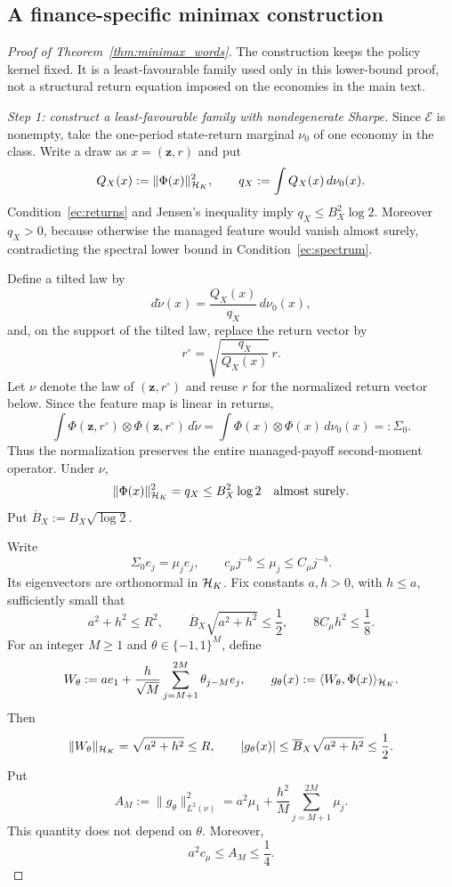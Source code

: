 \subsection{A finance-specific minimax construction}
\label{app:minimax}

\begin{proof}[Proof of Theorem~\ref{thm:minimax_words}]
The construction keeps the policy kernel fixed. It is a least-favourable family
used only in this lower-bound proof, not a structural return equation imposed on
the economies in the main text.

\medskip
\noindent\textit{Step 1: construct a least-favourable family with nondegenerate Sharpe.}
Since $\mathcal E$ is nonempty, take the one-period state-return marginal
$\nu_0$ of one economy in the class. Write a draw as
$x=(\mathbf z,r)$ and put
\[
Q_X(x):=\|\Phi(x)\|_{\mathcal{H}_K}^2,
\qquad
q_X:=\int Q_X(x)\,d\nu_0(x).
\]
Condition~\ref{ec:returns} and Jensen's inequality imply
$q_X\leq B_X^2\log2$. Moreover $q_X>0$, because otherwise the managed
feature would vanish almost surely, contradicting the spectral lower bound
in Condition~\ref{ec:spectrum}.

Define a tilted law by
\[
d\widetilde\nu(x)
=
\frac{Q_X(x)}{q_X}\,d\nu_0(x),
\]
and, on the support of the tilted law, replace the return vector by
\[
r^\circ
=
\sqrt{\frac{q_X}{Q_X(x)}}\,r.
\]
Let $\nu$ denote the law of $(\mathbf z,r^\circ)$ and reuse $r$ for the
normalized return vector below. Since the feature map is linear in returns,
\[
\int \Phi(\mathbf z,r^\circ)\otimes\Phi(\mathbf z,r^\circ)\,d\widetilde\nu
=
\int \Phi(x)\otimes\Phi(x)\,d\nu_0(x)
=:\Sigma_0.
\]
Thus the normalization preserves the entire managed-payoff second-moment
operator. Under $\nu$,
\[
\|\Phi(x)\|_{\mathcal{H}_K}^2=q_X\leq B_X^2\log2
\quad\text{almost surely}.
\]
Put $\overline B_X:=B_X\sqrt{\log2}$.

Write
\[
\Sigma_0e_j=\mu_je_j,
\qquad
c_\mu j^{-b}\leq\mu_j\leq C_\mu j^{-b}.
\]
Its eigenvectors are orthonormal in $\mathcal{H}_K$. Fix constants $a,h>0$,
with $h\leq a$, sufficiently small that
\[
a^2+h^2\leq R^2,
\qquad
\overline B_X\sqrt{a^2+h^2}\leq\frac12,
\qquad
8C_\mu h^2\leq\frac18.
\]
For an integer $M\geq1$ and $\theta\in\{-1,1\}^M$, define
\[
W_\theta
:=
a e_1
+
\frac{h}{\sqrt M}
\sum_{j=M+1}^{2M}\theta_{j-M}e_j,
\qquad
g_\theta(x)
:=
\langle W_\theta,\Phi(x)\rangle_{\mathcal{H}_K}.
\]
Then
\[
\|W_\theta\|_{\mathcal{H}_K}=\sqrt{a^2+h^2}\leq R,
\qquad
|g_\theta(x)|\leq \overline B_X\sqrt{a^2+h^2}\leq\frac12.
\]
Put
\[
A_M
:=
\|g_\theta\|_{L^2(\nu)}^2
=
a^2\mu_1
+
\frac{h^2}{M}
\sum_{j=M+1}^{2M}\mu_j.
\]
This quantity does not depend on $\theta$. Moreover,
\[
a^2c_\mu\leq A_M\leq\frac14.
\]


\end{proof}
